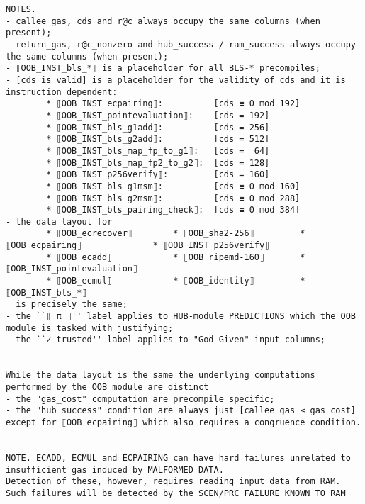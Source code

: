 \documentclass[varwidth=\maxdimen,margin=0.5cm,multi={verbatim}]{standalone}
\begin{document}
\begin{verbatim}
NOTES.
- callee_gas, cds and r@c always occupy the same columns (when present);
- return_gas, r@c_nonzero and hub_success / ram_success always occupy the same columns (when present);
- ⟦OOB_INST_bls_*⟧ is a placeholder for all BLS-* precompiles;
- [cds is valid] is a placeholder for the validity of cds and it is instruction dependent:
        * ⟦OOB_INST_ecpairing⟧:          [cds ≡ 0 mod 192]
        * ⟦OOB_INST_pointevaluation⟧:    [cds = 192]
        * ⟦OOB_INST_bls_g1add⟧:          [cds = 256]
        * ⟦OOB_INST_bls_g2add⟧:          [cds = 512]
        * ⟦OOB_INST_bls_map_fp_to_g1⟧:   [cds =  64]
        * ⟦OOB_INST_bls_map_fp2_to_g2⟧:  [cds = 128]
        * ⟦OOB_INST_p256verify⟧:         [cds = 160]
        * ⟦OOB_INST_bls_g1msm⟧:          [cds ≡ 0 mod 160]
        * ⟦OOB_INST_bls_g2msm⟧:          [cds ≡ 0 mod 288]
        * ⟦OOB_INST_bls_pairing_check⟧:  [cds ≡ 0 mod 384]
- the data layout for
        * ⟦OOB_ecrecover⟧        * ⟦OOB_sha2-256⟧         * ⟦OOB_ecpairing⟧              * ⟦OOB_INST_p256verify⟧
        * ⟦OOB_ecadd⟧            * ⟦OOB_ripemd-160⟧       * ⟦OOB_INST_pointevaluation⟧
        * ⟦OOB_ecmul⟧            * ⟦OOB_identity⟧         * ⟦OOB_INST_bls_*⟧
  is precisely the same;
- the ``⟦ π ⟧'' label applies to HUB-module PREDICTIONS which the OOB module is tasked with justifying;
- the ``✓ trusted'' label applies to "God-Given" input columns;


While the data layout is the same the underlying computations performed by the OOB module are distinct
- the "gas_cost" computation are precompile specific;
- the "hub_success" condition are always just [callee_gas ≤ gas_cost] except for ⟦OOB_ecpairing⟧ which also requires a congruence condition.


NOTE. ECADD, ECMUL and ECPAIRING can have hard failures unrelated to insufficient gas induced by MALFORMED DATA.
Detection of these, however, requires reading input data from RAM. Such failures will be detected by the SCEN/PRC_FAILURE_KNOWN_TO_RAM

\end{verbatim}
\end{document}
